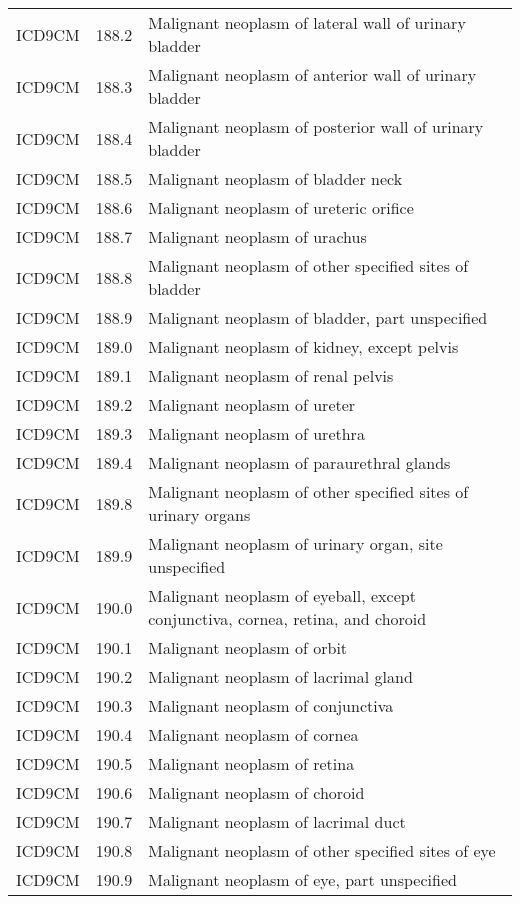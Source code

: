 \begin{longtable}{p{}p{}p{}}
  ICD9CM & 188.2 & Malignant neoplasm of lateral wall of urinary bladder \\ 
  ICD9CM & 188.3 & Malignant neoplasm of anterior wall of urinary bladder \\ 
  ICD9CM & 188.4 & Malignant neoplasm of posterior wall of urinary bladder \\ 
  ICD9CM & 188.5 & Malignant neoplasm of bladder neck \\ 
  ICD9CM & 188.6 & Malignant neoplasm of ureteric orifice \\ 
  ICD9CM & 188.7 & Malignant neoplasm of urachus \\ 
  ICD9CM & 188.8 & Malignant neoplasm of other specified sites of bladder \\ 
  ICD9CM & 188.9 & Malignant neoplasm of bladder, part unspecified \\ 
  ICD9CM & 189.0 & Malignant neoplasm of kidney, except pelvis \\ 
  ICD9CM & 189.1 & Malignant neoplasm of renal pelvis \\ 
  ICD9CM & 189.2 & Malignant neoplasm of ureter \\ 
  ICD9CM & 189.3 & Malignant neoplasm of urethra \\ 
  ICD9CM & 189.4 & Malignant neoplasm of paraurethral glands \\ 
  ICD9CM & 189.8 & Malignant neoplasm of other specified sites of urinary organs \\ 
  ICD9CM & 189.9 & Malignant neoplasm of urinary organ, site unspecified \\ 
  ICD9CM & 190.0 & Malignant neoplasm of eyeball, except conjunctiva, cornea, retina, and choroid \\ 
  ICD9CM & 190.1 & Malignant neoplasm of orbit \\ 
  ICD9CM & 190.2 & Malignant neoplasm of lacrimal gland \\ 
  ICD9CM & 190.3 & Malignant neoplasm of conjunctiva \\ 
  ICD9CM & 190.4 & Malignant neoplasm of cornea \\ 
  ICD9CM & 190.5 & Malignant neoplasm of retina \\ 
  ICD9CM & 190.6 & Malignant neoplasm of choroid \\ 
  ICD9CM & 190.7 & Malignant neoplasm of lacrimal duct \\ 
  ICD9CM & 190.8 & Malignant neoplasm of other specified sites of eye \\ 
  ICD9CM & 190.9 & Malignant neoplasm of eye, part unspecified \\ 

\end{longtable}
